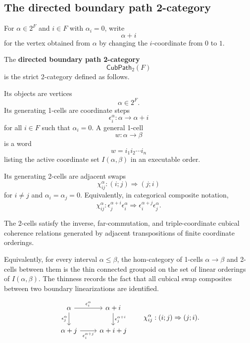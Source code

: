 \subsection{The directed boundary path 2-category}
\label{subsec:cmett-directed-boundary-path-2-category}

For \(\alpha\in 2^F\) and \(i\in F\) with \(\alpha_i=0\), write
\[
    \alpha+i
\]
for the vertex obtained from \(\alpha\) by changing the \(i\)-coordinate from
\(0\) to \(1\).

\begin{definition}
\label{def:cmett-directed-boundary-path-2-category}
    The \textbf{directed boundary path 2-category}
    \[
        \mathsf{CubPath}_2(F)
    \]
    is the strict 2-category defined as follows.

    Its objects are vertices
    \[
        \alpha\in 2^F.
    \]
    Its generating 1-cells are coordinate steps
    \[
        \epsilon_i^\alpha:\alpha\to\alpha+i
    \]
    for all \(i\in F\) such that \(\alpha_i=0\). A general 1-cell
    \[
        w:\alpha\to\beta
    \]
    is a word
    \[
        w=i_1i_2\cdots i_n
    \]
    listing the active coordinate set
    \(I(\alpha,\beta)\) in an executable order.

    Its generating 2-cells are adjacent swaps
    \[
        \chi_{ij}^{\alpha}:
        (i;j)\Longrightarrow(j;i)
    \]
    for \(i\neq j\) and \(\alpha_i=\alpha_j=0\). Equivalently, in
    categorical composite notation,
    \[
        \chi_{ij}^{\alpha}:
        \epsilon_j^{\alpha+i}\epsilon_i^\alpha
        \Longrightarrow
        \epsilon_i^{\alpha+j}\epsilon_j^\alpha .
    \]

    The 2-cells satisfy the inverse, far-commutation, and triple-coordinate
    cubical coherence relations generated by adjacent transpositions of finite
    coordinate orderings.
\end{definition}

Equivalently, for every interval \(\alpha\leq\beta\), the hom-category of
1-cells \(\alpha\to\beta\) and 2-cells between them is the thin connected
groupoid on the set of linear orderings of \(I(\alpha,\beta)\). The thinness
records the fact that all cubical swap composites between two boundary
linearizations are identified.

\[
\begin{tikzcd}
\alpha
    \arrow[r,"\epsilon_i^\alpha"]
    \arrow[d,"\epsilon_j^\alpha"']
&
\alpha+i
    \arrow[d,"\epsilon_j^{\alpha+i}"]
\\
\alpha+j
    \arrow[r,"\epsilon_i^{\alpha+j}"']
&
\alpha+i+j
\end{tikzcd}
\qquad
\chi_{ij}^{\alpha}:
(i;j)\Rightarrow(j;i).
\]

